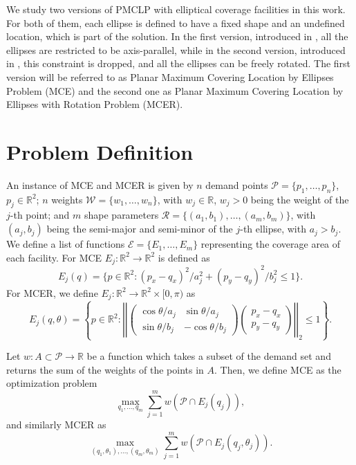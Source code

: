 \documentclass[a4]{elsarticle}
\newcommand{\R}{\mathbb{R}}
\newcommand{\Pp}{\mathscr{P}}
\newcommand{\E}{\mathscr{E}}
\newcommand{\Ww}{\mathscr{W}}
\newcommand{\Rr}{\mathscr{R}}
\begin{document}
	We study two versions of PMCLP with elliptical coverage facilities in this work. For both of them, each ellipse is defined to have a fixed shape and an undefined location, which is part of the solution.
	In the first version, introduced in \cite{canbolat}, all the ellipses are restricted to be axis-parallel, while in the second version, introduced in \cite{andreta}, this constraint is dropped, and all the ellipses can be freely rotated.
	The first version will be referred to as Planar Maximum Covering Location by Ellipses Problem (MCE) and the second one as  Planar Maximum Covering Location by Ellipses with Rotation Problem (MCER).
	
	\section{Problem Definition}
	
	An instance of MCE and MCER is given by $n$ demand points $\Pp=\{p_1, \dots, p_n\}$, $p_j\in\R^2$; $n$ weights $\Ww=\{w_1, \dots, w_n\}$, with $w_j\in\R$, $w_j>0$ being the weight of the $j$-th point; and $m$ shape parameters $\Rr=\{(a_1, b_1), \dots, (a_m, b_m)\}$, with $(a_j, b_j)$ being the semi-major and semi-minor of the $j$-th ellipse, with $a_j > b_j$. We define a list of functions $\E=\{E_1, \dots, E_m\}$ representing the coverage area of each facility. For MCE $E_j\colon\R^2\to\R^2$ is defined as
	\begin{equation}
	E_j(q) = \{p \in \R^2 \colon (p_x-q_x)^2/a_j^2 + (p_y-q_y)^2/b_j^2 \le 1\}.
	\end{equation}
	For MCER, we define $E_j \colon \R^2 \to \R^2 \times [0, \pi)$ as
	\begin{equation}
		E_j(q, \theta) = \left\{p \in \R^2 \colon 
		\left|\left|
		\left(
		\begin{array}{rr}
		\cos{\theta}/a_j & \sin{\theta}/a_j\\
		\sin{\theta}/b_j & -\cos{\theta}/b_j
		\end{array}
		\right)
		\left(
		\begin{array}{c}
		p_x-q_x\\
		p_y-q_y
		\end{array}
		\right)
		\right|\right|_2
		\le 1
		\right\}.
	\end{equation}
	
Let $w : A \subset \Pp \to \R$ be a function which takes a subset of the demand set and returns the sum of the weights of the points in $A$. Then, we define MCE as the optimization problem 
\begin{equation}
\max_{q_1, \dots, q_m} \sum_{j=1}^m w(\Pp \cap E_j(q_j)),
\end{equation}
and similarly MCER as
\begin{equation}
\max_{(q_1, \theta_1), \dots, (q_m, \theta_m)} \sum_{j=1}^m w(\Pp \cap E_j(q_j, \theta_j)).
\end{equation}
\end{document}
